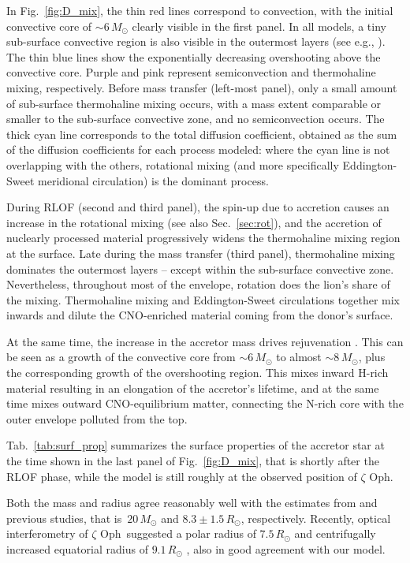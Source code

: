 \documentclass[twocolumn,twocolappendix,trackchanges]{aastex63}
\DeclareRobustCommand{\Figref}[1]{Fig.~\ref{#1}}
\DeclareRobustCommand{\Tabref}[1]{Tab.~\ref{#1}}
\DeclareRobustCommand{\Secref}[1]{Sec.~\ref{#1}}
\newcommand{\zoph}{$\zeta$ Oph}
\begin{document}
In \Figref{fig:D_mix}, the thin red lines correspond to convection,
with the initial convective core of
$\sim$$6\,M_\odot$ clearly visible in the first panel. In all models, a tiny sub-surface convective region is also visible in the outermost layers (see e.g., \citealt{cantiello:21}).  The thin blue lines show the exponentially decreasing overshooting above the convective core. Purple and pink represent semiconvection and thermohaline mixing, respectively. Before mass transfer (left-most panel), only a small amount of sub-surface thermohaline mixing occurs, with a mass extent comparable or smaller to the sub-surface convective zone, and no semiconvection occurs. The thick cyan line corresponds to the total diffusion coefficient, obtained as the sum of the diffusion coefficients for each process modeled: where the cyan line is not overlapping with the others, rotational mixing (and more specifically Eddington-Sweet meridional circulation) is the dominant process.

During RLOF (second and third panel), the spin-up due to accretion causes an increase in the rotational mixing (see also \Secref{sec:rot}), and the accretion of nuclearly processed material progressively widens the thermohaline mixing region at the surface. Late during the mass transfer (third panel), thermohaline mixing dominates the outermost layers -- except within the sub-surface convective zone. Nevertheless, throughout most of the envelope, rotation does the lion's share of the mixing. Thermohaline mixing and Eddington-Sweet circulations together mix inwards and dilute the CNO-enriched material coming from the donor's surface.

At the same time, the increase in the accretor mass drives
rejuvenation \citep[e.g.,][]{schneider:16}. This can be seen as a
growth of the convective core from
$\sim$$6\,M_\odot$ to almost $\sim$$8\,M_\odot$, plus the
corresponding growth of the overshooting region. This mixes inward
H-rich material resulting in an elongation of the accretor's lifetime,
and at the same time mixes outward CNO-equilibrium matter, connecting
the N-rich core with the outer envelope polluted from the top.



\Tabref{tab:surf_prop} summarizes the surface properties of the
accretor star at the time shown in the last panel of
\Figref{fig:D_mix}, that is shortly after the RLOF phase, while the
model is still roughly at the observed position of \zoph.

Both the mass and radius agree reasonably well with the estimates from
 and previous studies, that is~$20\,M_\odot$ and
$8.3\pm1.5\,R_\odot$, respectively. Recently, optical interferometry
of \zoph\ suggested a polar radius of $7.5\,R_\odot$ and centrifugally
increased equatorial radius of $9.1\,R_\odot$ \citep{gordon:18}, also
in good agreement with our model.
\end{document}
